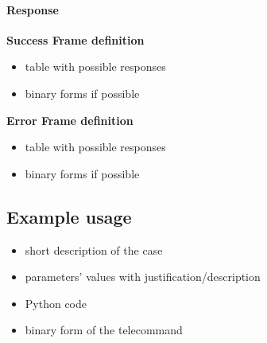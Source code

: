 \paragraph{Response}
    \textbf{Success Frame definition}
    \begin{itemize}
        \item table with possible responses
        \item binary forms if possible
    \end{itemize}


    \textbf{Error Frame definition}
    \begin{itemize}
        \item table with possible responses
        \item binary forms if possible
    \end{itemize}


\subsection{Example usage}

\begin{itemize}
    \item short description of the case
    \item parameters' values with justification/description
    \item Python code
    \item binary form of the telecommand
\end{itemize}
